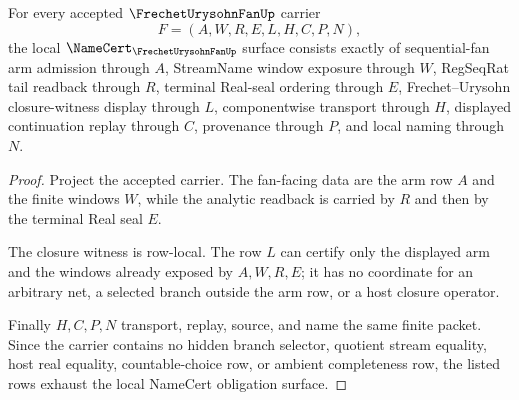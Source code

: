 \begin{theorem}
\label{thm:frechet-urysohn-fan-namecert-obligations}
For every accepted $\FrechetUrysohnFanUp$ carrier
$$
F=(A,W,R,E,L,H,C,P,N),
$$
the local $\NameCert_{\FrechetUrysohnFanUp}$ surface consists exactly of sequential-fan arm admission through $A$, StreamName window exposure through $W$, RegSeqRat tail readback through $R$, terminal Real-seal ordering through $E$, Frechet--Urysohn closure-witness display through $L$, componentwise transport through $H$, displayed continuation replay through $C$, provenance through $P$, and local naming through $N$.
\end{theorem}
\begin{proof}
Project the accepted carrier. The fan-facing data are the arm row $A$ and the finite windows $W$, while the analytic readback is carried by $R$ and then by the terminal Real seal $E$.

The closure witness is row-local. The row $L$ can certify only the displayed arm and the windows already exposed by $A,W,R,E$; it has no coordinate for an arbitrary net, a selected branch outside the arm row, or a host closure operator.

Finally $H,C,P,N$ transport, replay, source, and name the same finite packet. Since the carrier contains no hidden branch selector, quotient stream equality, host real equality, countable-choice row, or ambient completeness row, the listed rows exhaust the local NameCert obligation surface.
\end{proof}

